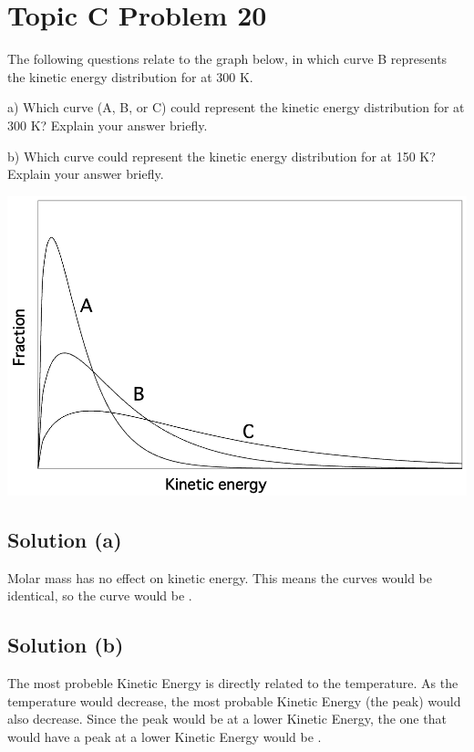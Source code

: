 \documentclass[10pt]{article}
\begin{document}
    \pagebreak
    \section{Topic C Problem 20}
        The following questions relate to the graph below, in which curve B represents the kinetic energy distribution for  at 300 K.

        a) Which curve (A, B, or C) could represent the kinetic energy distribution for  at 300 K? Explain your answer briefly.

        b) Which curve could represent the kinetic energy distribution for  at 150 K? Explain your answer briefly.

        \begin{center}
            \includegraphics[width=\textwidth]{picture_C-20.png}
        \end{center}

        \subsection{Solution (a)}
            Molar mass has no effect on kinetic energy. 
            This means the curves would be identical, so the curve would be .

        \subsection{Solution (b)}
            The most probeble Kinetic Energy is directly related to the temperature.
            As the temperature would decrease, the most probable Kinetic Energy (the peak) would also decrease.
            Since the peak would be at a lower Kinetic Energy, the one that would have a peak at a lower Kinetic Energy would be .
\end{document}
